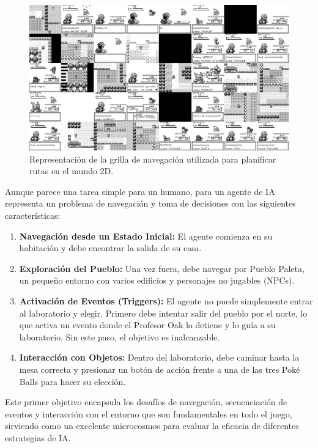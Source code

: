\documentclass[12pt, oneside, openany]{book}
\begin{document}
\begin{figure}[H]
    \centering
    \includegraphics[width=1\textwidth]{grid.png}
    \caption{Representación de la grilla de navegación utilizada para planificar rutas en el mundo 2D.}
    \label{fig:poke_map}
\end{figure}

Aunque parece una tarea simple para un humano, para un agente de IA representa un problema de navegación y toma de decisiones con las siguientes características:
\begin{enumerate}
    \item \textbf{Navegación desde un Estado Inicial:} El agente comienza en su habitación y debe encontrar la salida de su casa.
    \item \textbf{Exploración del Pueblo:} Una vez fuera, debe navegar por Pueblo Paleta, un pequeño entorno con varios edificios y personajes no jugables (NPCs).
    \item \textbf{Activación de Eventos (Triggers):} El agente no puede simplemente entrar al laboratorio y elegir. Primero debe intentar salir del pueblo por el norte, lo que activa un evento donde el Profesor Oak lo detiene y lo guía a su laboratorio. Sin este paso, el objetivo es inalcanzable.
    \item \textbf{Interacción con Objetos:} Dentro del laboratorio, debe caminar hasta la mesa correcta y presionar un botón de acción frente a una de las tres Poké Balls para hacer su elección.
\end{enumerate}

Este primer objetivo encapsula los desafíos de navegación, secuenciación de eventos y interacción con el entorno que son fundamentales en todo el juego, sirviendo como un excelente microcosmos para evaluar la eficacia de diferentes estrategias de IA.
\end{document}
